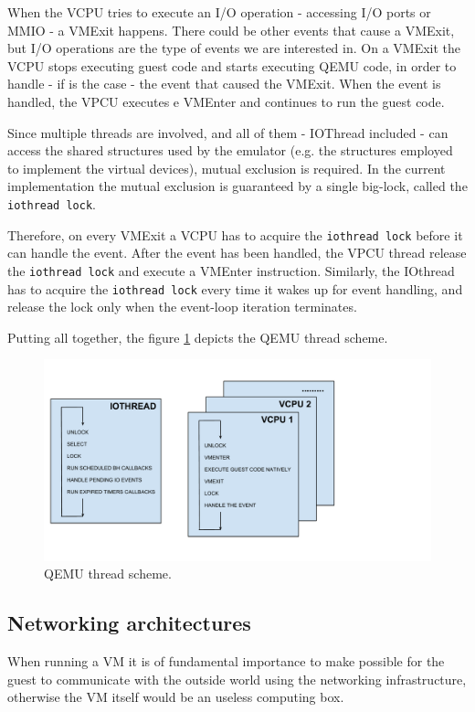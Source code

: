 When the VCPU tries to execute an I/O operation - accessing I/O ports or MMIO - a VMExit happens. There could be other events
that cause a VMExit, but I/O operations are the type of events we are interested in. On a VMExit the VCPU stops executing guest
code and starts executing QEMU code, in order to handle - if is the case - the event that caused the VMExit.
When the event is handled, the VPCU executes e VMEnter and continues to run the guest code.

\vspace{0.5cm}

Since multiple threads are involved, and all of them - IOThread included - can access the shared structures used by the emulator
(e.g. the structures employed to implement the virtual devices), mutual exclusion is required. In the current implementation the
mutual exclusion is guaranteed by a single big-lock, called the \texttt{iothread lock}.

Therefore, on every VMExit a VCPU has to acquire the \texttt{iothread lock} before it can handle the event. After the event has been
handled, the VPCU thread release the \texttt{iothread lock} and execute a VMEnter instruction.
Similarly, the IOthread has to acquire the \texttt{iothread lock} every time it wakes up for event handling, and release the lock
only when the event-loop iteration terminates.

Putting all together, the figure \ref{fig:qemuthreads} depicts the QEMU thread scheme.

\begin{figure}[bt]
\centering
\includegraphics[scale = 0.45]{qemu-threads.pdf}
\caption{QEMU thread scheme.}
\label{fig:qemuthreads}
\end{figure}



\subsection{Networking architectures}
\label{sec:qemunet}
When running a VM it is of fundamental importance to make possible for the guest to communicate with the outside world using the
networking infrastructure, otherwise the VM itself would be an useless computing box.

